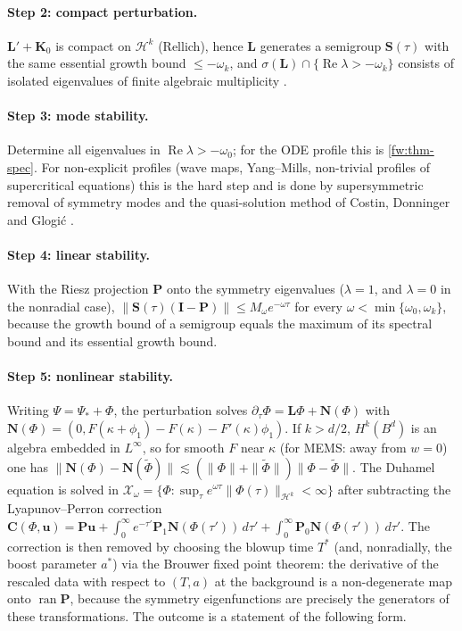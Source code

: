 \paragraph{Step 2: compact perturbation.} $\mathbf L'+\mathbf K_0$ is compact
on $\mathcal H^k$ (Rellich), hence $\mathbf L$ generates a semigroup
$\mathbf S(\tau)$ with the same essential growth bound $\le-\omega_k$, and
$\sigma(\mathbf L)\cap\{\operatorname{Re}\lambda>-\omega_k\}$ consists of
isolated eigenvalues of finite algebraic multiplicity
\cite[Ch.~IV]{EngelNagel2000}.

\paragraph{Step 3: mode stability.} Determine all eigenvalues in
$\operatorname{Re}\lambda>-\omega_0$; for the ODE profile this is
\cref{fw:thm-spec}. For non-explicit profiles (wave maps, Yang--Mills,
non-trivial profiles of supercritical equations) this is the hard step and
is done by supersymmetric removal of symmetry modes and the quasi-solution
method of Costin, Donninger and Glogić \cite{CostinDonningerGlogic2017}.

\paragraph{Step 4: linear stability.} With the Riesz projection $\mathbf P$
onto the symmetry eigenvalues ($\lambda=1$, and $\lambda=0$ in the nonradial
case), $\|\mathbf S(\tau)(\mathbf I-\mathbf P)\|\le M_\omega e^{-\omega\tau}$ for
every $\omega<\min\{\omega_0,\omega_k\}$, because the growth bound of a
semigroup equals the maximum of its spectral bound and its essential growth
bound.

\paragraph{Step 5: nonlinear stability.} Writing $\Psi=\Psi_*+\Phi$, the
perturbation solves $\partial_\tau\Phi=\mathbf L\Phi+\mathbf N(\Phi)$ with
$\mathbf N(\Phi)=(0,F(\kappa+\phi_1)-F(\kappa)-F'(\kappa)\phi_1)$. If $k>d/2$,
$H^k(B^d)$ is an algebra embedded in $L^\infty$, so for smooth $F$ near
$\kappa$ (for MEMS: away from $w=0$) one has
$\|\mathbf N(\Phi)-\mathbf N(\tilde\Phi)\|\lesssim(\|\Phi\|+\|\tilde\Phi\|)\|\Phi-\tilde\Phi\|$.
The Duhamel equation is solved in
$\mathcal X_\omega=\{\Phi:\sup_\tau e^{\omega\tau}\|\Phi(\tau)\|_{\mathcal H^k}<\infty\}$
after subtracting the Lyapunov--Perron correction
$\mathbf C(\Phi,\mathbf u)=\mathbf P\mathbf u+\int_0^\infty e^{-\tau'}\mathbf P_1\mathbf N(\Phi(\tau'))\,d\tau'
+\int_0^\infty\mathbf P_0\mathbf N(\Phi(\tau'))\,d\tau'$. The correction is then
removed by choosing the blowup time $T^*$ (and, nonradially, the boost
parameter $a^*$) via the Brouwer fixed point theorem:
the derivative of the rescaled data with respect to $(T,a)$ at the
background is a non-degenerate map onto $\operatorname{ran}\mathbf P$, because
the symmetry eigenfunctions are precisely the generators of these
transformations. The outcome is a statement of the following form.

